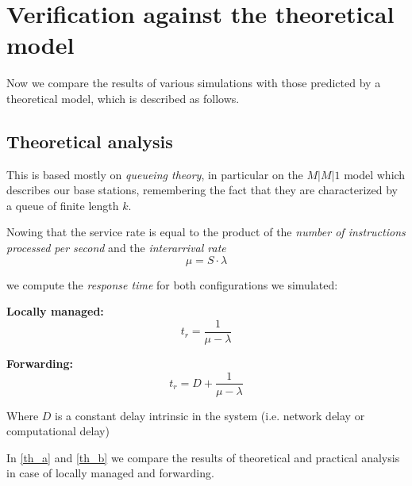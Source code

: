 \documentclass{report}
\begin{document}
\section{Verification against the theoretical model}
Now we compare the results of various simulations with those predicted by a theoretical model, which is described as follows.

\subsection{Theoretical analysis}
This is based mostly on \textit{queueing theory}, in particular on the $M|M|1$ model which describes our base stations, remembering the fact that they are characterized by a queue of finite length $k$.

Nowing that the service rate is equal to the product of the \textit{number of instructions processed per second} and the \textit{interarrival rate}
\[\mu = S\cdot \lambda\]

we compute the \textit{response time} for both configurations we simulated:

\textbf{Locally managed:}
\[t_r=\frac{1}{\mu-\lambda}\]

\textbf{Forwarding:}
\[t_r=D+\frac{1}{\mu-\lambda}\]

Where $D$ is a constant delay intrinsic in the system (i.e. network delay or computational delay)

In \autoref{th_a} and \autoref{th_b} we compare the results of theoretical and practical analysis in case of locally managed and forwarding.
\end{document}
